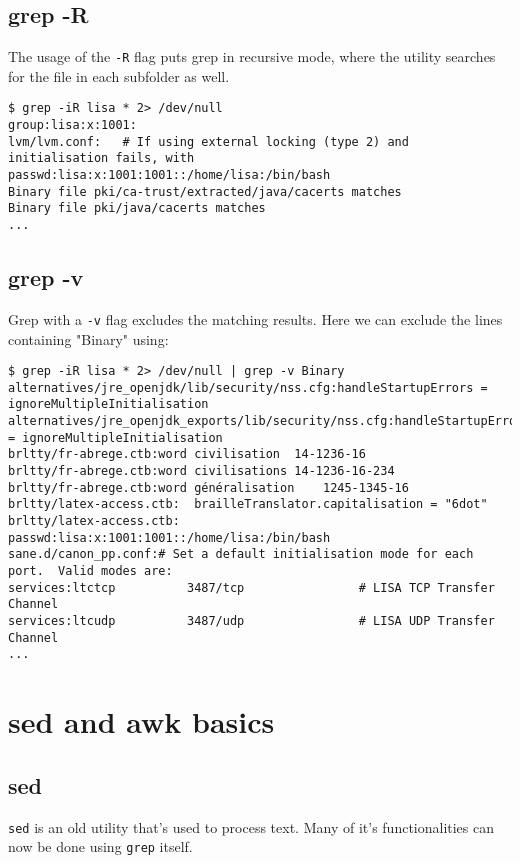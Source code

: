 \subsection{grep -R}
The usage of the \verb|-R| flag puts grep in recursive mode, where the utility searches for the file in each subfolder as well. 

\begin{verbatim}
$ grep -iR lisa * 2> /dev/null
group:lisa:x:1001:
lvm/lvm.conf:	# If using external locking (type 2) and initialisation fails, with
passwd:lisa:x:1001:1001::/home/lisa:/bin/bash
Binary file pki/ca-trust/extracted/java/cacerts matches
Binary file pki/java/cacerts matches
...
\end{verbatim}

\subsection{grep -v}
Grep with a \verb|-v| flag excludes the matching results. Here we can exclude the lines containing "Binary" using:

\begin{verbatim}
$ grep -iR lisa * 2> /dev/null | grep -v Binary
alternatives/jre_openjdk/lib/security/nss.cfg:handleStartupErrors = ignoreMultipleInitialisation
alternatives/jre_openjdk_exports/lib/security/nss.cfg:handleStartupErrors = ignoreMultipleInitialisation
brltty/fr-abrege.ctb:word civilisation	14-1236-16
brltty/fr-abrege.ctb:word civilisations	14-1236-16-234
brltty/fr-abrege.ctb:word généralisation	1245-1345-16
brltty/latex-access.ctb:  brailleTranslator.capitalisation = "6dot"
brltty/latex-access.ctb:      
passwd:lisa:x:1001:1001::/home/lisa:/bin/bash
sane.d/canon_pp.conf:# Set a default initialisation mode for each port.  Valid modes are:
services:ltctcp          3487/tcp                # LISA TCP Transfer Channel
services:ltcudp          3487/udp                # LISA UDP Transfer Channel
...
\end{verbatim}

\section{sed and awk basics}
\subsection{sed}
\verb|sed| is an old utility that's used to process text. Many of it's functionalities can now be done using \verb|grep| itself. 

